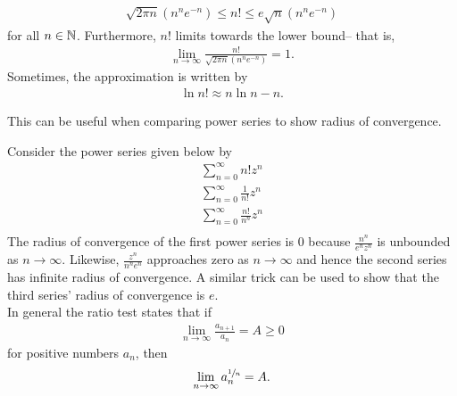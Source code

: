 \documentclass{memoir}
\begin{document}
\begin{prop}
	\begin{align*}
		\sqrt{2\pi n} (n^{n}e^{-n}) \leq n! \leq e\sqrt{n} (n^{n}e^{-n})
	\end{align*}
	for all \(n \in \mathbb{N}\). Furthermore, \(n!\) limits towards the lower bound-- that is,
	\begin{align*}
		\lim_{n \to \infty} \frac{n!}{\sqrt{2\pi n} (n^{n}e^{-n})} =1.
	\end{align*}
	Sometimes, the approximation is written by
	\begin{align*}
		\ln n! \approx n\ln n - n.
	\end{align*}
\end{prop}
This can be useful when comparing power series to show radius of convergence.

\begin{exmp}
	Consider the power series given below by
	\begin{align}
		\sum_{n=0}^{\infty} n! z^{n}\\
		\sum_{n=0}^{\infty} \frac{1}{n!}z^{n}\\
		\sum_{n=0}^{\infty} \frac{n!}{n^{n}}z^{n}\\
	\end{align}
	The radius of convergence of the first power series is 0 because \(\frac{n^{n}}{e^{n}z^{n}}\) is unbounded as \(n\to \infty\). Likewise, \(\frac{z^{n}}{n^{n}e^{n}}\) approaches zero as \(n\to \infty\) and hence the second series has infinite radius of convergence. A similar trick can be used to show that the third series' radius of convergence is \(e\).\\

	In general the ratio test states that if
	\begin{align*}
		\lim_{n \to \infty} \frac{a_{n+1}}{a_n} = A\geq 0
	\end{align*}
	for positive numbers \(a_n\), then
	\begin{align*}
		\lim_{n \to \infty} a_n^{\sfrac{1}{n}}=A.
	\end{align*}
\end{exmp}
\end{document}
